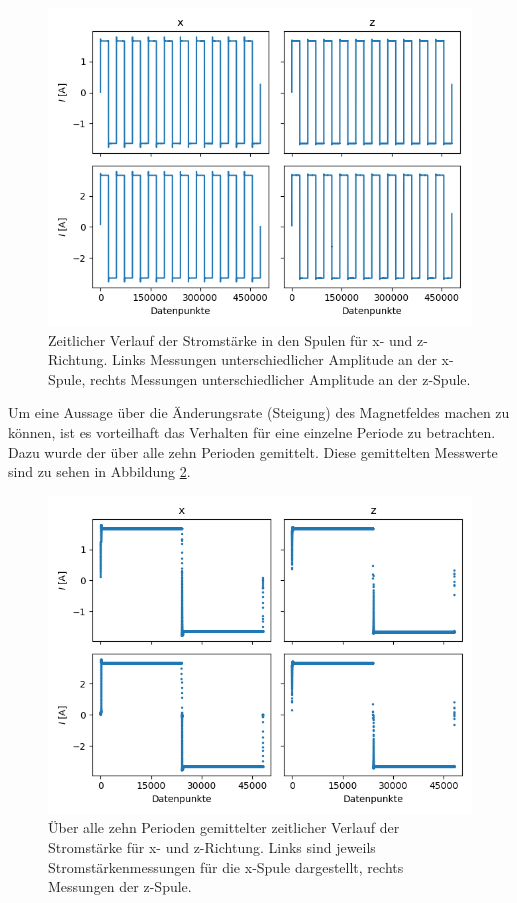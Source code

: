 \documentclass[page,pdftex,12pt,a4paper,twoside,openright]{scrbook}
\begin{document}
\begin{figure}[H]
\centering
\includegraphics[width=\textwidth]{img/strom.png}
\caption{\label{fig-stromraw}
Zeitlicher Verlauf der Stromstärke in den Spulen für x- und z-Richtung. Links Messungen unterschiedlicher Amplitude an der x-Spule, rechts Messungen unterschiedlicher Amplitude an der z-Spule.}
\end{figure}

Um eine Aussage über die Änderungsrate (Steigung) des Magnetfeldes machen zu können, ist es vorteilhaft das Verhalten für eine einzelne Periode zu betrachten. Dazu wurde der über alle zehn Perioden gemittelt. Diese gemittelten Messwerte sind zu sehen in Abbildung \ref{fig-stromavg}.

\begin{figure}[H]
\centering
\includegraphics[width=\textwidth]{img/strom_avg.png}
\caption{\label{fig-stromavg}
Über alle zehn Perioden gemittelter zeitlicher Verlauf der Stromstärke für x- und z-Richtung. Links sind jeweils Stromstärkenmessungen für die x-Spule dargestellt, rechts Messungen der z-Spule.}
\end{figure}
\end{document}
